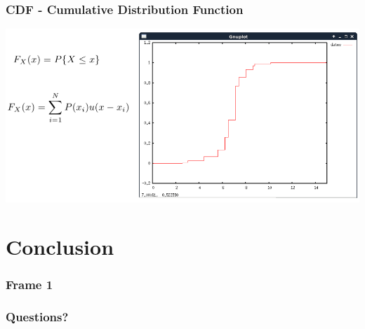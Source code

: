 \documentclass{beamer}
\begin{document}
\begin{frame}
\frametitle{CDF - Cumulative Distribution Function}
\begin{center}
\includegraphics[scale=0.35]{cdf1}
\end{center}
\end{frame}

\section{Conclusion}
\begin{frame}
\frametitle{Frame 1}
\end{frame}

\begin{frame}
\frametitle{Questions?}
\end{frame}
\end{document}
